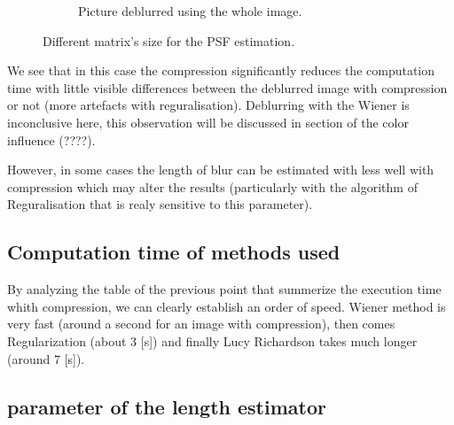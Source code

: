 \begin{figure}[h]
\begin{subfigure}{0.32\textwidth}
\vspace{-30pt}
\caption{Picture deblurred using the whole image.}
\label{fig:Regcom}
\end{subfigure}
\caption{Different matrix's size for the PSF estimation.}
\end{figure}

We see that in this case the compression significantly reduces the computation time with little visible differences between the deblurred image with compression or not (more artefacts with reguralisation). Deblurring with the Wiener is inconclusive here, this observation will be discussed in section of the color influence (????).

However, in some cases the length of blur can be estimated with less well with compression which may alter the results (particularly with the algorithm of Reguralisation that is realy sensitive to this parameter).

\subsection{Computation time of methods used}

By analyzing the table of the previous point that summerize the execution time whith compression, we can clearly establish an order of speed. Wiener method is very fast (around a second for an image with compression), then comes Regularization (about 3 [s]) and finally Lucy Richardson takes much longer (around 7 [s]).



\subsection{parameter of the length estimator}


